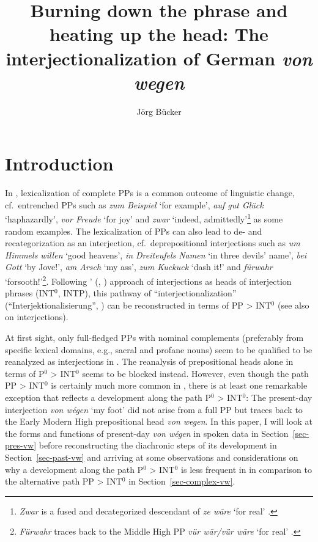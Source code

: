 \documentclass[output=paper
  ,nobabel
  ,draftmode
  ,babelshorthands
  ,colorlinks, citecolor=brown
]{langscibook}
\title[Burning down the phrase and heating up the head]{Burning down the phrase and heating up the head: The interjectionalization of German \emph{von wegen}}
\author{Jörg Bücker\orcid{0000-0003-4864-3374}\affiliation{Heinrich-Heine-Universität Düsseldorf}}
\begin{document}
\maketitle


\section{Introduction}\label{sec-intro-büc}

In , lexicalization of complete PPs is a common outcome of linguistic change, cf.\ entrenched PPs such as \emph{zum Beispiel} `for example', \emph{auf gut Glück} `haphazardly', \emph{vor Freude} `for joy'
and \emph{zwar} `indeed, admittedly'\footnote{\emph{Zwar} is a fused and decategorized descendant of \emph{ze wāre} `for real' \citep[cf.][1020]{Kluge2002}.}
as some random examples. The lexicalization of PPs can also lead to de- and recategorization as an interjection, cf.\
deprepositional interjections such as \emph{um Himmels willen} `good heavens', \emph{in Dreiteufels Namen} `in three devils' name', \emph{bei Gott} `by Jove!', \emph{am Arsch} `my ass', \emph{zum Kuckuck} `dash it!' and \emph{fürwahr} `forsooth!'\footnote{\textit{Fürwahr} traces back to the Middle High  PP \emph{vür wār/vür wāre} `for real' \citep[cf.][927]{GrimmGrimm1878}.}. 
Following \citeauthor{Fries1992}' (\citeyear{Fries1992}, \citeyear{Fries22}) approach of interjections as heads of interjection phrases (INT$^0$, INTP), this pathway of ``interjectionalization'' (``Interjektionalisierung'', \citealp{Nuebling2001}) can be reconstructed in terms of PP > INT$^0$ (see also \citealp{Ehlich1986,Reisigl1999,Nuebling2004} on interjections).

At first sight, only full-fledged PPs with nominal complements (preferably from specific lexical domains, e.g., sacral and profane nouns) seem to be qualified to be reanalyzed as interjections in . The reanalysis of prepositional heads alone in terms of P$^0$ > INT$^0$ seems to be blocked instead. However, even though the path PP > INT$^0$ is certainly much more common in , there is at least one remarkable exception that reflects a development along the path P$^0$ > INT$^0$: The present-day  interjection \emph{von wégen} `my foot' did not arise from a full PP but traces back to the Early Modern High  prepositional head \emph{von wegen}. In this paper, I will look at the forms and functions of present-day  \emph{von wégen} in spoken data in Section~\ref{sec-pres-vw} before reconstructing the diachronic steps of its development in Section~\ref{sec-past-vw} and arriving at some observations and considerations on why a development along the path P$^0$ > INT$^0$ is less frequent in  in comparison to the alternative path PP > INT$^0$ in Section~\ref{sec-complex-vw}.
\end{document}
